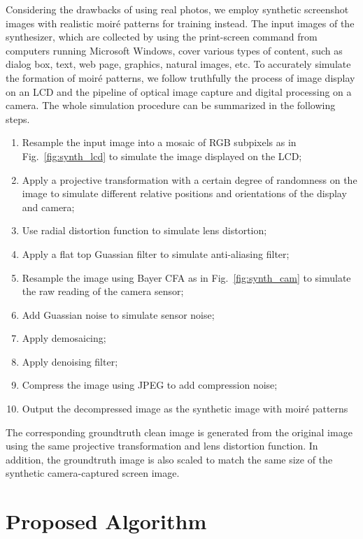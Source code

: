 \documentclass[10pt,twocolumn,letterpaper]{article}
\begin{document}
Considering the drawbacks of using real photos, we employ synthetic
screenshot images with realistic moir\'e patterns for training
instead.  The input images of the synthesizer, which are collected by
using the print-screen command from computers running Microsoft
Windows, cover various types of content, such as dialog box, text, web
page, graphics, natural images, etc.  To accurately simulate the
formation of moir\'e patterns, we follow truthfully the process of
image display on an LCD and the pipeline of optical image capture and
digital processing on a camera.  The whole simulation procedure can be
summarized in the following steps.
\begin{enumerate}
\item Resample the input image into a mosaic of RGB subpixels as in
  Fig.~\ref{fig:synth_lcd} to simulate the image displayed on the LCD;
\item Apply a projective transformation with a certain degree of
  randomness on the image to simulate different relative positions and
  orientations of the display and camera;
\item Use radial distortion function to simulate lens distortion;
\item Apply a flat top Guassian filter to simulate anti-aliasing
  filter;
\item Resample the image using Bayer CFA as in
  Fig.~\ref{fig:synth_cam} to simulate the raw reading of the camera
  sensor;
\item Add Guassian noise to simulate sensor noise;
\item Apply demosaicing;
\item Apply denoising filter;
\item Compress the image using JPEG to add compression noise;
\item Output the decompressed image as the synthetic image with
  moir\'e patterns
\end{enumerate}
The corresponding groundtruth clean image is generated from the
original image using the same projective transformation and lens
distortion function.  In addition, the groundtruth image is also
scaled to match the same size of the synthetic camera-captured screen
image.

\section{Proposed Algorithm}
\label{sec:algorithm}
\end{document}
